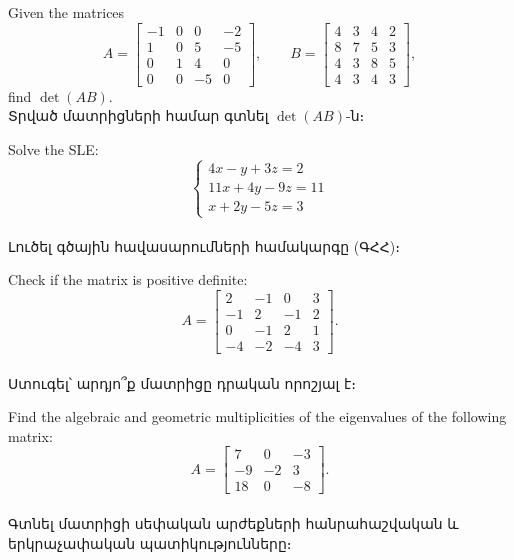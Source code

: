 \begin{problem}
Given the matrices
\[ A = \begin{bmatrix}
-1&0&0&-2\\1&0&5&-5\\0&1&4&0\\0&0&-5&0
\end{bmatrix},\qquad B = \begin{bmatrix}
4&3&4&2\\8&7&5&3\\4&3&8&5\\4&3&4&3
\end{bmatrix}, \]
find $\det(AB)$.
\\
\textarmenian{Տրված մատրիցների համար գտնել $\det(AB)$-ն։}
\end{problem}
\medskip

\begin{problem}
Solve the SLE:
\[
\begin{cases}
    4x - y + 3z = 2\\
    11x + 4y - 9z = 11\\
    x + 2y - 5z = 3
\end{cases}
 \]
\\
\textarmenian{Լուծել գծային հավասարումների համակարգը (Գ\-ՀՀ)։}
\end{problem}
\medskip


\begin{problem}
Check if the matrix is positive definite:
\[ A = \begin{bmatrix}
2& -1& 0& 3\\
-1& 2 &-1 & 2\\
0& -1& 2 & 1 \\
-4& -2& -4 & 3 
\end{bmatrix}.\]
\\
\textarmenian{Ստուգել՝ արդյո՞ք մատրիցը դրական որոշյալ է։}
\end{problem}
\medskip

\begin{problem}
Find the algebraic and geometric multiplicities of the eigenvalues of the following matrix:
\[ A = \begin{bmatrix}
7 &0& -3\\
-9 &-2& 3\\
18 &0& -8
\end{bmatrix}. \]
\\
\textarmenian{Գտնել մատրիցի սեփական արժեքների հանրահաշվական և երկրաչափական պատիկությունները։}
\end{problem}
\medskip


